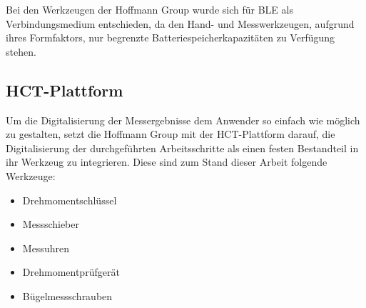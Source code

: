 Bei den Werkzeugen der Hoffmann Group wurde sich für \ac{BLE} als Verbindungsmedium entschieden, da den Hand- und Messwerkzeugen, aufgrund ihres Formfaktors, nur begrenzte Batteriespeicherkapazitäten zu Verfügung stehen.

\subsection{HCT-Plattform}
Um die Digitalisierung der Messergebnisse dem Anwender so einfach wie möglich zu gestalten, setzt die Hoffmann Group mit der \ac{HCT}-Plattform darauf, die Digitalisierung der durchgeführten Arbeitsschritte als einen festen Bestandteil in ihr Werkzeug zu integrieren. Diese sind zum Stand dieser Arbeit folgende Werkzeuge: 
\begin{itemize}
	\item Drehmomentschlüssel
	\item Messschieber
	\item Messuhren
	\item Drehmomentprüfgerät
	\item Bügelmessschrauben
\end{itemize}
